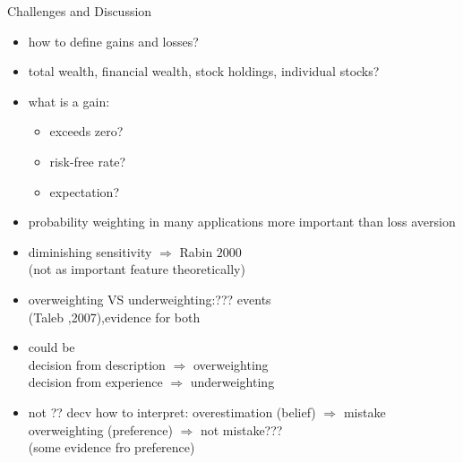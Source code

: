 \documentclass[11pt,aspectratio=169]{beamer}
\begin{document}
\begin{frame}{Challenges and Discussion}
    \begin{itemize}
        \item how to define gains and losses?\\
        \item total wealth, financial wealth, stock holdings, individual stocks?\\
        \item what is a gain:\\
        \begin{itemize}
            \item exceeds zero?\\
            \item risk-free rate?\\
            \item expectation?\\
        \end{itemize}
        \item probability weighting in many applications more important than loss aversion\\
        \item diminishing sensitivity  $\Rightarrow$  Rabin $2000$ \\
        (not as important feature theoretically)
        \item overweighting VS underweighting:??? events\\
        (Taleb ,2007),evidence for both\\
        \item could be \\
        \qquad decision from description $\Rightarrow$ overweighting\\
        \qquad decision from experience $\Rightarrow$ underweighting\\
        \item not ?? decv how to interpret:
        \qquad overestimation (belief) $\Rightarrow$ mistake\\
        \qquad overweighting (preference) $\Rightarrow$ not mistake???\\
        (some evidence fro preference)
    \end{itemize}  
\end{frame}
\end{document}
